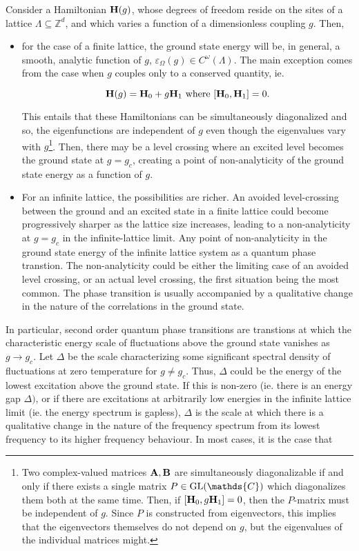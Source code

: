 Consider a Hamiltonian ${\bf H}(g)$, whose degrees of freedom reside on the sites of a lattice $\Lambda \subseteq \mathds{Z}^d$, and which varies a function of a dimensionless coupling $g$. Then,

\begin{itemize}
    \item for the case of a finite lattice, the ground state energy will be, in general, a smooth, analytic function of $g$, $\varepsilon_{\Omega} (g) \in C^{\omega}(\Lambda) $. The main exception comes from the case when $g$ couples only to a conserved quantity, ie.
    
    $$
        {\bf H}(g) = {\bf H}_0 + g {\bf H}_1 \textnormal{ where } [{\bf H}_0, {\bf H}_1] = 0.  
    $$
    
    This entails that these Hamiltonians can be simultaneously diagonalized and so, the eigenfunctions are independent of $g$ even though the eigenvalues vary with $g$\footnote{Two complex-valued matrices ${\bf A}, {\bf B}$ are simultaneously diagonalizable if and only if there exists a single matrix $P \in \textnormal{GL}(\mathds{C})$ which diagonalizes them both at the same time. Then, if $[{\bf H}_0, g{\bf H}_1] = 0$, then the $P$-matrix must be independent of $g$. Since $P$ is constructed from eigenvectors, this implies that the eigenvectors themselves do not depend on $g$, but the eigenvalues of the individual matrices might.}. Then, there may be a level crossing where an excited level becomes the ground state at $g = g_c$, creating a point of non-analyticity of the ground state energy as a function of $g$. \\
    
    \item For an infinite lattice, the possibilities are richer. An avoided level-crossing between the ground and an excited state in a finite lattice could become progressively sharper as the lattice size increases, leading to a non-analyticity at $g = g_c$ in the infinite-lattice limit. Any point of non-analyticity in the ground state energy of the infinite lattice system as a quantum phase transtion. The non-analyticity could be either the limiting case of an avoided level crossing, or an actual level crossing, the first situation being the most common. The phase transition is usually accompanied by a qualitative change in the nature of the correlations in the ground state. \\
\end{itemize}

In particular, second order quantum phase transitions are transtions at which the characteristic energy scale of fluctuations above the ground state vanishes as $g \rightarrow g_c$. Let $\Delta$ be the scale characterizing some significant spectral density of fluctuations at zero temperature for $g \neq g_c$. Thus, $\Delta$ could be the energy of the lowest excitation above the ground state. If this is non-zero (ie. there is an energy gap $\Delta)$, or if there are excitations at arbitrarily low energies in the infinite lattice limit (ie. the energy spectrum is gapless), $\Delta$ is the scale at which there is a qualitative change in the nature of the frequency spectrum from its lowest frequency to its higher frequency behaviour. In most cases, it is the case that 

